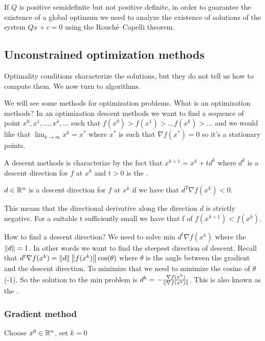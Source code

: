 If $Q$ is positive semidefinite but not positive definite, in order to guarantee the existence of a global optimum we need to analyze the existence of solutions of the system $Qx+c=0$ using the Rouch\'e--Capelli theorem.

\subsection{Unconstrained optimization methods}

Optimality conditions characterize the solutions, but they do not tell us how to compute them. We now turn to algorithms.

We will see some methods for optimization problems. What is an optimization methods? In an optimization descent methods we want to find a sequence of point $x^0,x^1, \dots, x^k, \dots$ such that $f(x^0)>f(x^1)>\dots f(x^k)>\dots$ and we would like that $\lim_{k \to \infty}x^k = x^*$ where $x^*$ is such that $\nabla f(x^*)=0$ so it's a stationary points.

A descent methods is characterize by the fact that $x^{k+1} = x^k + td^k$ where $d^k$ is a descent direction for $f$ at $x^k$ and $t>0$ is the .

\begin{definition}
    $d \in \mathbb{R}^n$ is a descent direction for $f$ at $x^k$ if we have that $d^T \nabla f(x^k) < 0$.
\end{definition}
This means that the directional derivative along the direction $d$ is strictly negative. For a suitable t sufficiently small we have that f of $f(x^{k+1}) < f(x^k)$.

How to find a descent direction? We need to solve min $d^t \nabla f(x^k) $ where the $\left\lVert d \right\rVert=1$. In other words we want to find the steepest direction of descent. Recall that $d^t \nabla f(x^k) = \left\lVert d \right\rVert\left\lVert f(x^k) \right\rVert\cos(\theta)$ where $\theta$ is the angle between the gradient and the descent direction. To minimize that we need to minimize the cosine of $\theta$ (-1). So the solution to the min problem is $d^k=- \frac{\nabla f(x^k)}{\left\lVert \nabla f(x^k) \right\rVert}$. This is also known as the .

\subsubsection{Gradient method}

\begin{algorithm}[htbp]
\caption{Gradient method}
Choose $x^0 \in \mathbb{R}^n$, set $k = 0$\;
\end{algorithm}
